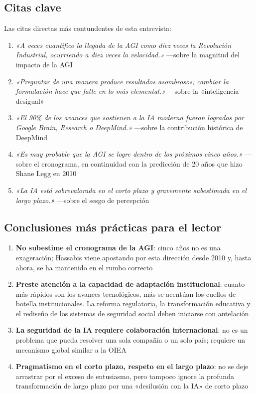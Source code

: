 \subsection{Citas clave}

Las citas directas más contundentes de esta entrevista:

\begin{enumerate}
    \item \textit{«A veces cuantifico la llegada de la AGI como diez veces la Revolución Industrial, ocurriendo a diez veces la velocidad.»} —sobre la magnitud del impacto de la AGI
    \item \textit{«Preguntar de una manera produce resultados asombrosos; cambiar la formulación hace que falle en lo más elemental.»} —sobre la «inteligencia desigual»
    \item \textit{«El 90\% de los avances que sostienen a la IA moderna fueron logrados por Google Brain, Research o DeepMind.»} —sobre la contribución histórica de DeepMind
    \item \textit{«Es muy probable que la AGI se logre dentro de los próximos cinco años.»} —sobre el cronograma, en continuidad con la predicción de 20 años que hizo Shane Legg en 2010
    \item \textit{«La IA está sobrevalorada en el corto plazo y gravemente subestimada en el largo plazo.»} —sobre el sesgo de percepción
\end{enumerate}

\subsection{Conclusiones más prácticas para el lector}

\begin{enumerate}
    \item \textbf{No subestime el cronograma de la AGI}: cinco años no es una exageración; Hassabis viene apostando por esta dirección desde 2010 y, hasta ahora, se ha mantenido en el rumbo correcto
    \item \textbf{Preste atención a la capacidad de adaptación institucional}: cuanto más rápidos son los avances tecnológicos, más se acentúan los cuellos de botella institucionales. La reforma regulatoria, la transformación educativa y el rediseño de los sistemas de seguridad social deben iniciarse con antelación
    \item \textbf{La seguridad de la IA requiere colaboración internacional}: no es un problema que pueda resolver una sola compañía o un solo país; requiere un mecanismo global similar a la OIEA
    \item \textbf{Pragmatismo en el corto plazo, respeto en el largo plazo}: no se deje arrastrar por el exceso de entusiasmo, pero tampoco ignore la profunda transformación de largo plazo por una «desilusión con la IA» de corto plazo
\end{enumerate}

